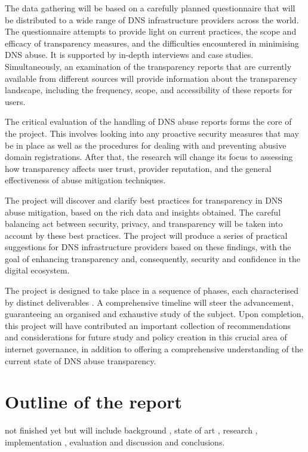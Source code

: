 The data gathering will be based on a carefully planned questionnaire that will be distributed to a wide range of DNS infrastructure providers across the world. The questionnaire attempts to provide light on current practices, the scope and efficacy of transparency measures, and the difficulties encountered in minimising DNS abuse. It is supported by in-depth interviews and case studies. Simultaneously, an examination of the transparency reports that are currently available from different sources will provide information about the transparency landscape, including the frequency, scope, and accessibility of these reports for users.

The critical evaluation of the handling of DNS abuse reports forms the core of the project. This involves looking into any proactive security measures that may be in place as well as the procedures for dealing with and preventing abusive domain registrations. After that, the research will change its focus to assessing how transparency affects user trust, provider reputation, and the general effectiveness of abuse mitigation techniques.

The project will discover and clarify best practices for transparency in DNS abuse mitigation, based on the rich data and insights obtained. The careful balancing act between security, privacy, and transparency will be taken into account by these best practices. The project will produce a series of practical suggestions for DNS infrastructure providers based on these findings, with the goal of enhancing transparency and, consequently, security and confidence in the digital ecosystem.

The project is designed to take place in a sequence of phases, each characterised by distinct deliverables . A comprehensive timeline will steer the advancement, guaranteeing an organised and exhaustive study of the subject. Upon completion, this project will have contributed an important collection of recommendations and considerations for future study and policy creation in this crucial area of internet governance, in addition to offering a comprehensive understanding of the current state of DNS abuse transparency.

\section{Outline of the report}
not finished yet but will include background , state of art , research , implementation , evaluation and discussion and conclusions. 